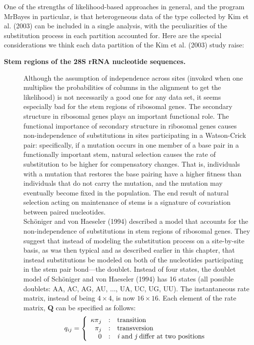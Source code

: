 \documentclass{svmult}
\begin{document}
One of the strengths of likelihood-based approaches in general, and the program MrBayes in
particular, is that heterogeneous data of the type collected by Kim et al. (2003) can be included
in a single analysis, with the peculiarities of the substitution process in each partition
accounted for. Here are the special considerations we think each data partition of the Kim et al.
(2003) study raise:

\begin{description}
\item[ {\bf Stem regions of the 28S rRNA nucleotide sequences.}] Although the assumption of
independence across sites (invoked when one multiplies the probabilities of columns in the
alignment to get the likelihood) is not necessarily a good one for any data set, it seems
especially bad for the stem regions of ribosomal genes.  The secondary structure in
ribosomal genes plays an important functional role. The functional importance of secondary
structure in ribosomal genes causes non-independence of substitutions in sites
participating in a Watson-Crick pair: specifically,  if a mutation occurs in one member of
a base pair in a functionally important stem, natural selection causes the rate of
substitution to be higher for compensatory changes. That is, individuals with a mutation
that restores the base pairing have a higher fitness than individuals that do not carry the
mutation, and the mutation may eventually become fixed in the population. The end result of
natural selection acting on maintenance of stems is a signature of covariation between
paired nucleotides.\\

Sch\"oniger and von Haeseler (1994) described a model that accounts for the non-independence of
substitutions in stem regions of ribosomal genes. They suggest that instead of modeling the
substitution process on a site-by-site basis, as was then typical and as described earlier
in this chapter, that instead substitutions be modeled on both of the nucleotides
participating in the stem pair bond---the doublet.  Instead of four states, the doublet
model of Sch\"oniger and  von Haeseler (1994) has 16 states (all possible doublets: AA, AC,
AG, AU, $\ldots$, UA, UC, UG, UU). The instantaneous rate matrix, instead of being $4
\times 4$, is now $16 \times 16$. Each element of the rate matrix, ${\mathbf Q}$ can be
specified as follows:
$$
q_{ij} = \left\{
   \begin{array}{r@{\quad:\quad}l}
      {\kappa \pi}_j & \mbox{transition}                                  \\
      {       \pi}_j & \mbox{transversion}                                \\
      0             & \mbox{{\it i} and {\it j} differ at two positions} \\
   \end{array}
\right.
$$


\end{description}
\end{document}
